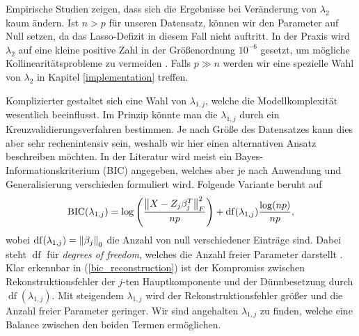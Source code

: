 Empirische Studien zeigen, dass sich die Ergebnisse bei Veränderung von $\lambda_2$ kaum ändern. Ist $n > p$ für unseren Datensatz, können wir den Parameter auf Null setzen, da das Lasso-Defizit in diesem Fall nicht auftritt. In der Praxis wird $\lambda_2$ auf eine kleine positive Zahl in der Größenordnung $10^{-6}$ gesetzt, um mögliche Kollinearitätsprobleme zu vermeiden \cite{zou_sparsepca}. Falls $p \gg n$ werden wir eine spezielle Wahl von $\lambda_2$ in Kapitel \ref{implementation} treffen.

Komplizierter gestaltet sich eine Wahl von $\lambda_{1,j}$, welche die Modellkomplexität wesentlich beeinflusst. Im Prinzip könnte man die $\lambda_{1,j}$ durch ein Kreuzvalidierungsverfahren bestimmen. Je nach Größe des Datensatzes kann dies aber sehr rechenintensiv sein, weshalb wir hier einen alternativen Ansatz beschreiben möchten. In der Literatur wird meist ein Bayes-Informationskriterium (BIC) angegeben, welches aber je nach Anwendung und Generalisierung verschieden formuliert wird. Folgende Variante beruht auf \cite{hubert, allen}
\begin{align}
\label{bic_reconstruction}
\operatorname{BIC}(\lambda_{1,j}) = \log\left(\frac{\left\lVert X - Z_j\beta_j^T \right\rVert_{F}^{2}}{np}\right) + \operatorname{df}(\lambda_{1,j}) \frac{\log(np)}{np},
\end{align}
wobei $\operatorname{df}(\lambda_{1,j}) = \left\lVert \beta_j \right\rVert_0$ die Anzahl von null verschiedener Einträge sind. Dabei steht $\operatorname{df}$ für \textit{degrees of freedom}, welches die Anzahl freier Parameter darstellt \cite{hastie_elements}. Klar erkennbar in (\ref{bic_reconstruction}) ist der Kompromiss zwischen Rekonstruktionsfehler der $j$-ten Hauptkomponente und der Dünnbesetzung durch $\operatorname{df}(\lambda_{1,j})$. Mit steigendem $\lambda_{1,j}$ wird der Rekonstruktionsfehler größer und die Anzahl freier Parameter geringer. Wir sind angehalten $\lambda_{1,j}$ zu finden, welche eine Balance zwischen den beiden Termen ermöglichen.

